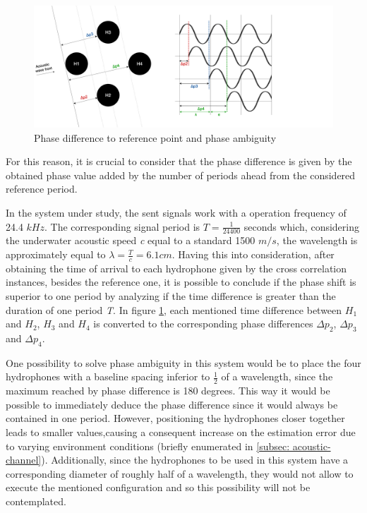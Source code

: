 \begin{figure}[!htbp]
	\centering
	\includegraphics[width=1.2\textwidth]{figures/phase-diff}
	\caption{Phase difference to reference point and phase ambiguity}
	\label{fig:phasediff}
\end{figure}

For this reason, it is crucial to consider that the phase difference is given by the obtained phase value added by the number of periods ahead from the considered reference period.

In the system under study, the sent signals work with a operation frequency of 24.4 $kHz$. The corresponding signal period is $T = \frac{1}{24400} $ seconds which, considering the underwater acoustic speed \textit{c} equal to a standard 1500 $m/s$, the wavelength is approximately equal to $\lambda = \frac{T}{c} = 6.1 cm$. Having this into consideration, after obtaining the time of arrival to each hydrophone given by the cross correlation instances, besides the reference one, it is possible to conclude if the phase shift is superior to one period by analyzing if the time difference is greater than the duration of one period \textit{T}. In figure \ref{fig:phasediff}, each mentioned time difference between $H_1$ and $H_2$, $H_3$ and $H_4$ is converted to the corresponding phase differences $\Delta p_2$, $\Delta p_3$ and $\Delta p_4$.


One possibility to solve phase ambiguity in this system would be to place the four hydrophones with a baseline spacing inferior to $\frac{1}{2}$ of a wavelength, since the maximum reached by phase difference is 180 degrees. This way it would be possible to immediately deduce the phase difference since it would always be contained in one period. However, positioning the hydrophones closer together leads to smaller  values,causing a consequent increase on the estimation error due to varying environment conditions (briefly enumerated in \ref{subsec: acoustic-channel}). Additionally, since the hydrophones to be used in this system have a corresponding diameter of roughly half of a wavelength, they would not allow to execute the mentioned configuration and so this possibility will not be contemplated.

